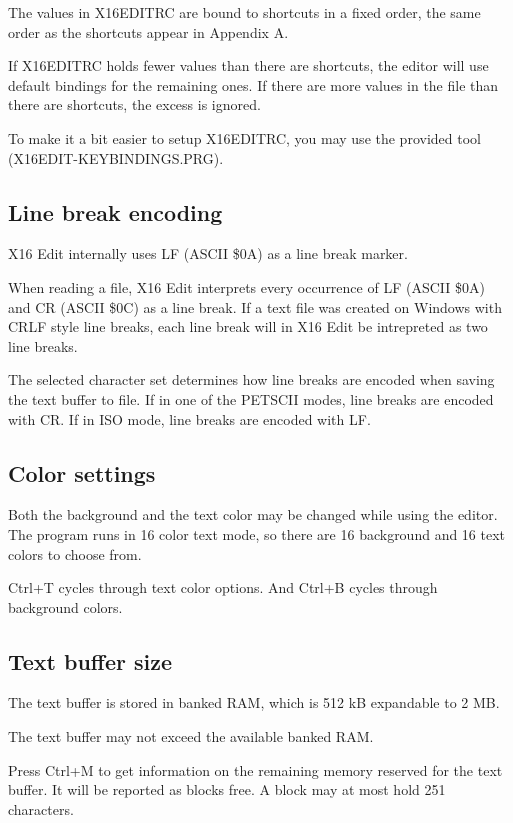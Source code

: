\documentclass{article}
\begin{document}
        The values in X16EDITRC are bound to shortcuts in a fixed order, the same order as
        the shortcuts appear in Appendix A.
        
        If X16EDITRC holds fewer values than there are shortcuts, the editor will use
        default bindings for the remaining ones. If there are more values in the file than there
        are shortcuts, the excess is ignored.
        
        To make it a bit easier to setup X16EDITRC, you may use the provided tool
        (X16EDIT-KEYBINDINGS.PRG).

    \subsection{Line break encoding}
        X16 Edit internally uses LF (ASCII \$0A) as a line break marker.

        When reading a file, X16 Edit interprets every occurrence of LF (ASCII \$0A) and CR (ASCII \$0C) as
        a line break. If a text file was created on Windows with CRLF style line breaks, each line break
        will in X16 Edit be intrepreted as two line breaks.

        The selected character set determines how line breaks are encoded when saving the text buffer
        to file. If in one of the PETSCII modes, line breaks are encoded with CR. If in ISO mode, line
        breaks are encoded with LF.

    \subsection{Color settings}
        Both the background and the text color may be changed while using the editor. 
        The program runs in 16 color text mode, so there are 16 background and 16 text colors to choose from.

        Ctrl+T cycles through text color options.
        And Ctrl+B cycles through background colors.

    \subsection{Text buffer size}
        The text buffer is stored in banked RAM, which is 512 kB expandable to 2 MB.

        The text buffer may not exceed the available banked RAM.

        Press Ctrl+M to get information on the remaining memory reserved for the
        text buffer. It will be reported as blocks free. A block may at most hold 251 characters.
\end{document}
